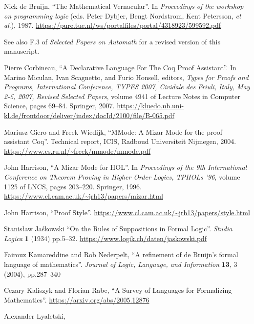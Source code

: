 \begin{enumerate}[label={[\arabic*]},left=0pt]
\item\label{de-bruijn-vernacular} Nick de Bruijn,
  ``The Mathematical Vernacular''.
  In \emph{Proceedings of the workshop on programming logic}
  (eds. Peter Dybjer, Bengt Nordstrom, Kent Petersson, \emph{et al}.),
  1987. \url{https://pure.tue.nl/ws/portalfiles/portal/4318923/599592.pdf}

  See also {F.3} of \emph{Selected Papers on Automath} for a revised
  version of this manuscript.
\item\label{corbineau-czar} Pierre Corbineau,
  ``A Declarative Language For The Coq Proof Assistant''.
  In Marino Miculan, Ivan Scagnetto, and Furio Honsell, editors, \emph{Types for Proofs and Programs, International Conference, TYPES 2007, Cividale des Friuli, Italy, May 2-5, 2007, Revised Selected Papers},
  volume 4941 of Lecture Notes in Computer Science, pages 69--84. Springer, 2007.
  \url{https://kluedo.ub.uni-kl.de/frontdoor/deliver/index/docId/2100/file/B-065.pdf}
\item\label{giero-wiedijk-mmode} Mariusz Giero and Freek Wiedijk,
  ``MMode: A Mizar Mode for the proof assistant Coq''.
  Technical report, ICIS, Radboud Universiteit Nijmegen, 2004.
  \url{https://www.cs.ru.nl/~freek/mmode/mmode.pdf}
\item\label{harrison-mizar-mode} John Harrison,
  ``A Mizar Mode for HOL''.
  In \emph{Proceedings of the 9th International Conference on Theorem Proving in Higher Order Logics, TPHOLs '96}, volume
  1125 of LNCS, pages 203--220. Springer, 1996.
  \url{https://www.cl.cam.ac.uk/~jrh13/papers/mizar.html}
\item\label{harrison:proof-style} John Harrison,
  ``Proof Style''.
  \url{https://www.cl.cam.ac.uk/~jrh13/papers/style.html}
\item\label{jaskowski-suppositions} Stanis\l aw Ja\'skowski
  ``On the Rules of Suppositions in Formal Logic''.
  \emph{Studia Logica} \textbf{1} (1934) pp.5--32.
  \url{https://www.logik.ch/daten/jaskowski.pdf}
\item\label{kamareddine-nederpelt-wtt} Fairouz Kamareddine and Rob Nederpelt,
  ``A refinement of de Bruijn's formal language of mathematics''.
  \emph{Journal of Logic, Language, and Information} \textbf{13}, 3 (2004), pp.287--340
\item\label{kaliszyk-rabe-language} Cezary Kaliszyk and Florian Rabe,
  ``A Survey of Languages for Formalizing Mathematics''.
  \url{https://arxiv.org/abs/2005.12876}
\item\label{lyaletski-sad} Alexander Lyaletski,

\end{enumerate}
